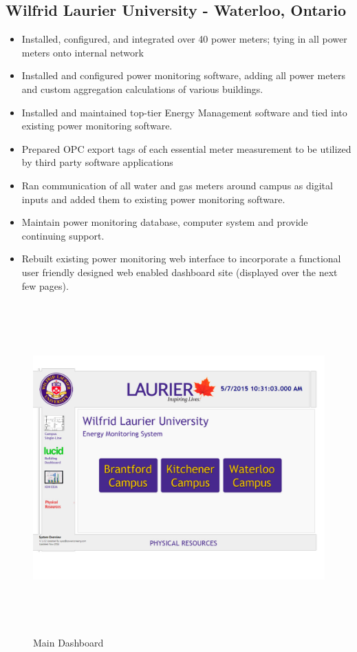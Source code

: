 \subsection{Wilfrid Laurier University - Waterloo, Ontario}
\label{PreExp:WLU}
	
	\begin{itemize}
		\item Installed, configured, and integrated over 40 power meters; tying in all power meters onto internal network
		\item Installed and configured power monitoring software, adding all power meters and custom aggregation calculations of various buildings. 
		\item Installed and maintained top-tier Energy Management software and tied into existing power monitoring software.
		\item Prepared OPC export tags of each essential meter measurement to be utilized by third party software applications
		\item Ran communication of all water and gas meters around campus as digital inputs and added them to existing power monitoring software.
		\item Maintain power monitoring database, computer system and provide continuing support.
		\item Rebuilt existing power monitoring web interface to incorporate a functional user friendly designed web enabled dashboard site (displayed over the next few pages). 
	\end{itemize}

\pagebreak

	\begin{center}
	\begin{figure}
			\includegraphics[height=5in]{../Images/WLU1.png}
		\caption{Main Dashboard}
		\label{fig:MainDashboard}
	\end{figure}

	\end{center}



